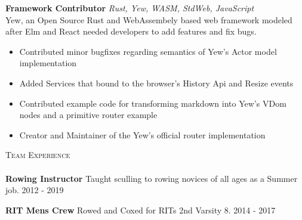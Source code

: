 \documentclass[a4paper]{article}
\newcommand{\lineunder} {
    \vspace*{-8pt} \\
    \hspace*{-18pt} \hrulefill \\
}
\newcommand{\header} [1] {
    {\hspace*{-18pt}\vspace*{6pt} \textsc{#1}}
    \vspace*{-6pt} \lineunder
}
\begin{document}
\begin{addmargin}[1em]{2em}%
{\textbf{Framework Contributor}} {\sl Rust, Yew, WASM, StdWeb, JavaScript} \\
Yew, an Open Source Rust and WebAssembely based web framework modeled after Elm and React needed developers to add features and fix bugs.
\vspace*{-2mm}
\begin{itemize}[leftmargin=4.5mm] \itemsep -1mm
	\item Contributed minor bugfixes regarding semantics of Yew's Actor model implementation
	\item Added Services that bound to the browser's History Api and Resize events
    \item Contributed example code for transforming markdown into Yew's VDom nodes and a primitive router example
    \item Creator and Maintainer of the Yew's official router implementation
\end{itemize}
\vspace*{2mm}
\end{addmargin}


\header{Team Experience}
\textbf{Rowing Instructor}
Taught sculling to rowing novices of all ages as a Summer job. \hfill 2012 - 2019\\
\vspace*{2mm}

\textbf{RIT Men\textquotesingle{}s Crew}
Rowed and Coxed for RIT\textquotesingle{}s 2nd Varsity 8. \hfill  2014 - 2017\\
\vspace*{2mm}
\end{document}
